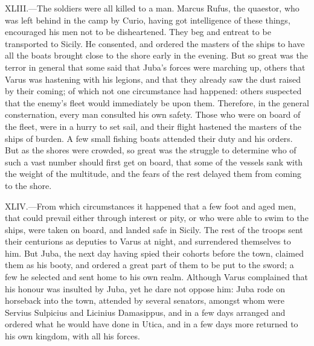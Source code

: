 XLIII.—The soldiers were all killed to a man. Marcus Rufus, the
quaestor, who was left behind in the camp by Curio, having got
intelligence of these things, encouraged his men not to be disheartened.
They beg and entreat to be transported to Sicily. He consented, and
ordered the masters of the ships to have all the boats brought close to
the shore early in the evening. But so great was the terror in general
that some said that Juba's forces were marching up, others that Varus
was hastening with his legions, and that they already saw the dust
raised by their coming; of which not one circumstance had happened:
others suspected that the enemy's fleet would immediately be upon them.
Therefore, in the general consternation, every man consulted his own
safety. Those who were on board of the fleet, were in a hurry to set
sail, and their flight hastened the masters of the ships of burden. A
few small fishing boats attended their duty and his orders. But as the
shores were crowded, so great was the struggle to determine who of such
a vast number should first get on board, that some of the vessels sank
with the weight of the multitude, and the fears of the rest delayed them
from coming to the shore.

XLIV.—From which circumstances it happened that a few foot and aged
men, that could prevail either through interest or pity, or who were
able to swim to the ships, were taken on board, and landed safe in
Sicily. The rest of the troops sent their centurions as deputies to
Varus at night, and surrendered themselves to him. But Juba, the next
day having spied their cohorts before the town, claimed them as his
booty, and ordered a great part of them to be put to the sword; a few he
selected and sent home to his own realm. Although Varus complained that
his honour was insulted by Juba, yet he dare not oppose him: Juba rode
on horseback into the town, attended by several senators, amongst whom
were Servius Sulpicius and Licinius Damasippus, and in a few days
arranged and ordered what he would have done in Utica, and in a few days
more returned to his own kingdom, with all his forces.


